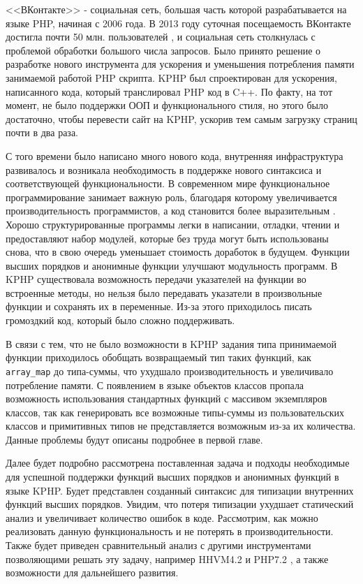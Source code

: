 \startprefacepage
<<ВКонтакте>> - социальная сеть, большая часть которой разрабатывается на языке PHP, начиная с 2006 года.
В 2013 году суточная посещаемость ВКонтакте достигла почти 50 млн. пользователей \cite{kphp-vk-2013}, и социальная сеть столкнулась с проблемой обработки большого числа запросов.
Было принято решение о разработке нового инструмента для ускорения и уменьшения потребления памяти занимаемой работой PHP скрипта.
KPHP был спроектирован для ускорения, написанного кода, который транслировал PHP код в C++.
По факту, на тот момент, не было поддержки ООП и функционального стиля, но этого было достаточно, чтобы перевести сайт на KPHP, ускорив тем самым загрузку страниц почти в два раза.

С того времени было написано много нового кода, внутренняя инфраструктура развивалось и возникала необходимость в поддержке нового синтаксиса и соответствующей функциональности.
В современном мире функциональное программирование занимает важную роль, благодаря которому увеличивается производительность программистов, а код становится более выразительным \cite{fp-matters}.
Хорошо структурированные программы легки в написании, отладки, чтении и предоставляют набор модулей, которые без труда могут быть использованы снова, что в свою очередь уменьшает стоимость доработок в будущем. Функции высших порядков и анонимные функции улучшают модульность программ.
В KPHP существовала возможность передачи указателей на функции во встроенные методы, но нельзя было передавать указатели в произвольные функции и сохранять их в переменные.
Из-за этого приходилось писать громоздкий код, который было сложно поддерживать.

В связи с тем, что не было возможности в KPHP задания типа принимаемой функции приходилось обобщать возвращаемый тип таких функций, как \verb|array_map| до типа-суммы, что ухудшало производительность и увеличивало потребление памяти.
С появлением в языке объектов классов пропала возможность использования стандартных функций с массивом экземпляров классов, так как генерировать все возможные типы-суммы из пользовательских классов и примитивных типов не представляется возможным из-за их количества.
Данные проблемы будут описаны подробнее в первой главе.

Далее будет подробно рассмотрена поставленная задача и подходы необходимые для успешной поддержки функций высших порядков и анонимных функций в языке KPHP.
Будет представлен созданный синтаксис для типизации внутренних функций высших порядков.
Увидим, что потеря типизации ухудшает статический анализ и увеличивает количество ошибок в коде.
Рассмотрим, как можно реализовать данную функциональность и не потерять в производительности.
Также будет приведен сравнительный анализ с другими инструментами позволяющими решать эту задачу, например HHVM4.2 \cite{hhvm} и PHP7.2 \cite{php7}, а также возможности для дальнейшего развития.
